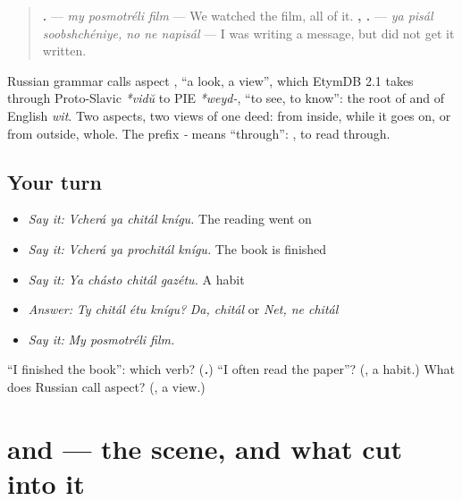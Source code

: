 \begin{culture}
\begin{quote}
\textbf{  .} — \emph{my posmotréli film} — We watched the film, all of it. \textbf{  ,   .} — \emph{ya pisál soobshchéniye, no ne napisál} — I was writing a message, but did not get it written.
\end{quote}
\end{culture}

\begin{cousinweb}
Russian grammar calls aspect \textbf{}, \textquotedblleft{}a look, a view\textquotedblright{}, which EtymDB 2.1 takes through Proto-Slavic \emph{*vidŭ} to PIE \emph{*weyd-}, \textquotedblleft{}to see, to know\textquotedblright{}: the root of \textbf{} and of English \emph{wit}. Two aspects, two views of one deed: from inside, while it goes on, or from outside, whole. The prefix \emph{-} means \textquotedblleft{}through\textquotedblright{}: \textbf{}, to read through.
\end{cousinweb}

\subsection*{Your turn}
\begin{itemize}
\raggedright
  \item \emph{Say it:} \emph{Vcherá ya chitál knígu.} The reading went on
  \item \emph{Say it:} \emph{Vcherá ya prochitál knígu.} The book is finished
  \item \emph{Say it:} \emph{Ya chásto chitál gazétu.} A habit
  \item \emph{Answer:} \emph{Ty chitál étu knígu?} \emph{Da, chitál} or \emph{Net, ne chitál}
  \item \emph{Say it:} \emph{My posmotréli film.}
\end{itemize}

\begin{tcolorbox}[breakable,colback=teal!4,colframe=teal!35!black,title={Before you move on}]
\textquotedblleft{}I finished the book\textquotedblright{}: which verb? (\emph{\textbf{.}}) \textquotedblleft{}I often read the paper\textquotedblright{}? (\emph{\textbf{}}, a habit.) What does Russian call aspect? (\emph{\textbf{}}, a view.)
\end{tcolorbox}
\section[\texorpdfstring{\ru{когда} …, …; \ru{пока} … (kogdá …, …; poká …)}{когда …, …; пока … (kogdá …, …; poká …)}]{ and  — the scene, and what cut into it}

